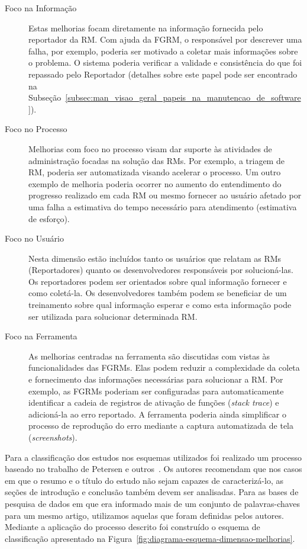 \begin{description}
	\item[Foco na Informação] Estas melhorias focam diretamente na informação
		fornecida pelo reportador da RM\@. Com ajuda da FGRM, o responsável por
		descrever uma falha, por exemplo, poderia ser motivado a coletar mais
		informações sobre o problema. O sistema poderia verificar a validade e
		consistência do que foi repassado pelo Reportador (detalhes sobre este
		papel pode ser encontrado na
		Subseção~\ref{subsec:man_visao_geral_papeis_na_manutencao_de_software}).
	\item[Foco no Processo] Melhorias com foco no processo visam dar suporte às
		atividades de administração focadas na solução das RMs. Por exemplo, a
		triagem de RM, poderia ser automatizada visando acelerar o processo. Um
		outro exemplo de melhoria poderia ocorrer no aumento do entendimento do
		progresso realizado em cada RM ou mesmo fornecer ao usuário afetado por
		uma falha a estimativa do tempo necessário para atendimento (estimativa
		de esforço).
	\item[Foco no Usuário] Nesta dimensão estão incluídos tanto os usuários que
		relatam as RMs (Reportadores) quanto os desenvolvedores responsáveis por
        solucioná-las. Os reportadores podem ser orientados sobre qual
        informação fornecer e como coletá-la. Os desenvolvedores também podem se
        beneficiar de um treinamento sobre qual informação esperar e como esta
        informação pode ser utilizada para solucionar determinada RM\@.
	\item[Foco na Ferramenta] As melhorias centradas na ferramenta são
		discutidas com vistas às funcionalidades das FGRMs\@. Elas podem reduzir
		a complexidade da coleta e fornecimento das informações necessárias para
		solucionar a RM\@. Por exemplo, as FGRMs poderiam ser configuradas para
		automaticamente identificar a cadeia de registros de ativação de funções
        (\textit{stack trace}) e adicioná-la ao erro reportado. A ferramenta
        poderia ainda simplificar o processo de reprodução do erro mediante a
        captura automatizada de tela (\textit{screenshots}).
\end{description}

Para a classificação dos estudos nos esquemas utilizados foi realizado um
processo baseado no trabalho de Petersen e outros~\cite{Petersen2008}. Os
autores recomendam que nos casos em que o resumo e o título do estudo não sejam
capazes de caracterizá-lo, as seções de introdução e conclusão também devem ser
analisadas. Para as bases de pesquisa de dados em que era informado mais de um
conjunto de palavras-chaves para um mesmo artigo, utilizamos aquelas que foram
definidas pelos autores. Mediante a aplicação do processo descrito foi
construído o esquema de classificação apresentado na
Figura~\ref{fig:diagrama-esquema-dimensao-melhorias}.

